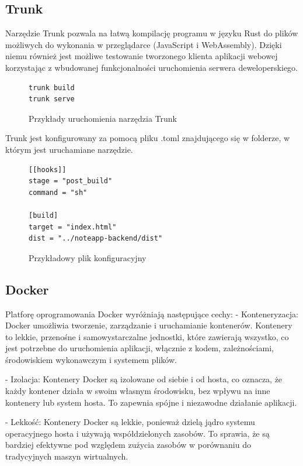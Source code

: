 \documentclass[a4paper,twoside,12pt]{book}
\begin{document}
\subsection{Trunk}

Narzędzie Trunk pozwala na łatwą kompilację programu w języku Rust do plików możliwych do wykonania
w przeglądarce (JavaScript i WebAssembly). Dzięki niemu również jest możliwe testowanie tworzonego klienta
aplikacji webowej korzystając z wbudowanej funkcjonalności uruchomienia serwera deweloperskiego.

\begin{figure}
\centering
\begin{lstlisting}
trunk build
trunk serve
\end{lstlisting}
\caption{Przykłady uruchomienia narzędzia Trunk}
\label{fig:pseudokod:listings}
\end{figure}

Trunk jest konfigurowany za pomocą pliku .toml znajdującego się w folderze, w którym jest uruchamiane narzędzie.

\begin{figure}
\centering
\begin{lstlisting}
[[hooks]]
stage = "post_build"
command = "sh"

[build]
target = "index.html"
dist = "../noteapp-backend/dist"
\end{lstlisting}
\caption{Przykładowy plik konfiguracyjny}
\label{fig:pseudokod:trunk_conf}
\end{figure}

\subsection{Docker}

Platforę oprogramowania Docker wyróżniają następujące cechy:
- Konteneryzacja:
    Docker umożliwia tworzenie, zarządzanie i uruchamianie kontenerów. Kontenery to lekkie, przenośne i samowystarczalne jednostki, które zawierają wszystko, co jest potrzebne do uruchomienia aplikacji, włącznie z kodem, zależnościami, środowiskiem wykonawczym i systemem plików.

- Izolacja:
    Kontenery Docker są izolowane od siebie i od hosta, co oznacza, że każdy kontener działa w swoim własnym środowisku, bez wpływu na inne kontenery lub system hosta. To zapewnia spójne i niezawodne działanie aplikacji.

- Lekkość:
    Kontenery Docker są lekkie, ponieważ dzielą jądro systemu operacyjnego hosta i używają współdzielonych zasobów. To sprawia, że są bardziej efektywne pod względem zużycia zasobów w porównaniu do tradycyjnych maszyn wirtualnych.
\end{document}
